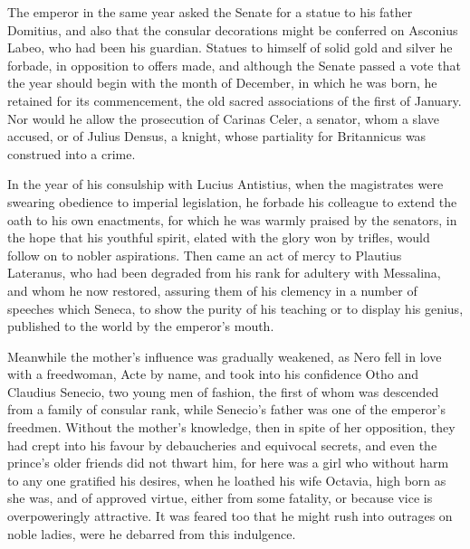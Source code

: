 
The emperor in the same year asked the Senate for a statue to his father Domitius, and also that the consular decorations might be conferred on Asconius Labeo, who had been his guardian. Statues to himself of solid gold and silver he forbade, in opposition to offers made, and although the Senate passed a vote that the year should begin with the month of December, in which he was born, he retained for its commencement, the old sacred associations of the first of January. Nor would he allow the prosecution of Carinas Celer, a senator, whom a slave accused, or of Julius Densus, a knight, whose partiality for Britannicus was construed into a crime.


In the year of his consulship with Lucius Antistius, when the magistrates were swearing obedience to imperial legislation, he forbade his colleague to extend the oath to his own enactments, for which he was warmly praised by the senators, in the hope that his youthful spirit, elated with the glory won by trifles, would follow on to nobler aspirations. Then came an act of mercy to Plautius Lateranus, who had been degraded from his rank for adultery with Messalina, and whom he now restored, assuring them of his clemency in a number of speeches which Seneca, to show the purity of his teaching or to display his genius, published to the world by the emperor's mouth.


Meanwhile the mother's influence was gradually weakened, as Nero fell in love with a freedwoman, Acte by name, and took into his confidence Otho and Claudius Senecio, two young men of fashion, the first of whom was descended from a family of consular rank, while Senecio's father was one of the emperor's freedmen. Without the mother's knowledge, then in spite of her opposition, they had crept into his favour by debaucheries and equivocal secrets, and even the prince's older friends did not thwart him, for here was a girl who without harm to any one gratified his desires, when he loathed his wife Octavia, high born as she was, and of approved virtue, either from some fatality, or because vice is overpoweringly attractive. It was feared too that he might rush into outrages on noble ladies, were he debarred from this indulgence.


